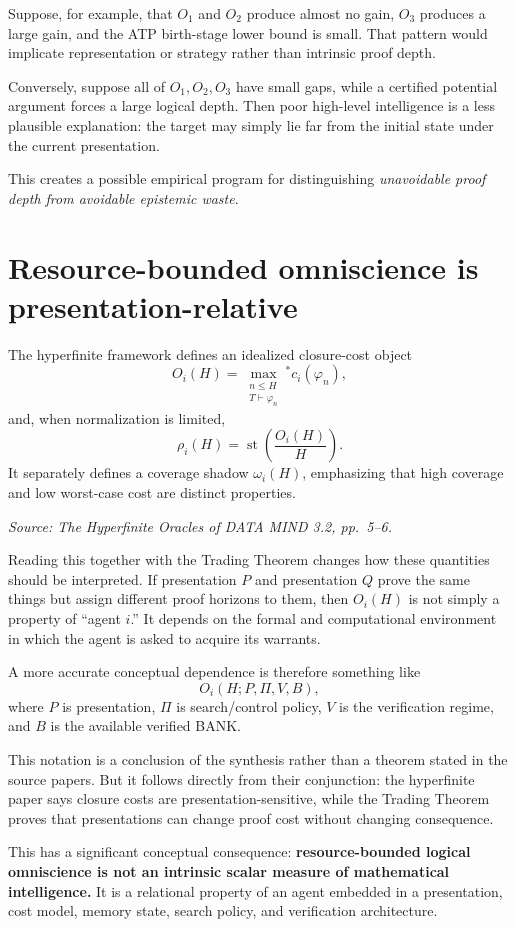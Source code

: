 \documentclass[11pt]{article}
\newcommand{\src}[1]{\par\smallskip\noindent\textit{Source: #1}\normalsize}
\newcommand{\st}{\operatorname{st}}
\begin{document}
Suppose, for example, that $O_1$ and $O_2$ produce almost no gain, $O_3$ produces a large gain, and the ATP birth-stage lower bound is small. That pattern would implicate representation or strategy rather than intrinsic proof depth.

Conversely, suppose all of $O_1,O_2,O_3$ have small gaps, while a certified potential argument forces a large logical depth. Then poor high-level intelligence is a less plausible explanation: the target may simply lie far from the initial state under the current presentation.

This creates a possible empirical program for distinguishing \emph{unavoidable proof depth from avoidable epistemic waste}.

\section{Resource-bounded omniscience is presentation-relative}

The hyperfinite framework defines an idealized closure-cost object
\[
O_i(H)
=
\max_{\substack{n\le H\\T\vdash\varphi_n}}
{}^*c_i(\varphi_n),
\]
and, when normalization is limited,
\[
\rho_i(H)=\st\!\left(\frac{O_i(H)}{H}\right).
\]
It separately defines a coverage shadow $\omega_i(H)$, emphasizing that high coverage and low worst-case cost are distinct properties.
\src{\emph{The Hyperfinite Oracles of DATA MIND 3.2}, pp.~5--6.}

Reading this together with the Trading Theorem changes how these quantities should be interpreted. If presentation $P$ and presentation $Q$ prove the same things but assign different proof horizons to them, then $O_i(H)$ is not simply a property of ``agent $i$.'' It depends on the formal and computational environment in which the agent is asked to acquire its warrants.

A more accurate conceptual dependence is therefore something like
\[
O_i(H;P,\Pi,V,B),
\]
where $P$ is presentation, $\Pi$ is search/control policy, $V$ is the verification regime, and $B$ is the available verified BANK.

This notation is a conclusion of the synthesis rather than a theorem stated in the source papers. But it follows directly from their conjunction: the hyperfinite paper says closure costs are presentation-sensitive, while the Trading Theorem proves that presentations can change proof cost without changing consequence.

This has a significant conceptual consequence: \textbf{resource-bounded logical omniscience is not an intrinsic scalar measure of mathematical intelligence.} It is a relational property of an agent embedded in a presentation, cost model, memory state, search policy, and verification architecture.
\end{document}

